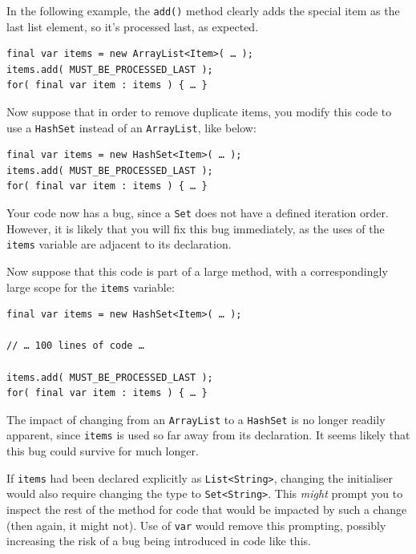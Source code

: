 \documentclass[11pt,a4paper, titlepage, parskip=half, headsepline, footsepline, cleardoublepage=current, headheight=1cm]{scrbook}
\begin{document}
In the following example, the \lstinline|add()| method clearly adds the special item as the last list element, so it’s processed last, as expected.
\begin{lstlisting}
final var items = new ArrayList<Item>( … );
items.add( MUST_BE_PROCESSED_LAST );
for( final var item : items ) { … }
\end{lstlisting}

Now suppose that in order to remove duplicate items, you modify this code to use a \lstinline|HashSet|\autocite{ORACLE_DOC_HASHSET_CLASS} instead of an \lstinline|ArrayList|\autocite{ORACLE_DOC_ARRAYLIST_CLASS}, like below:
\begin{lstlisting}
final var items = new HashSet<Item>( … );
items.add( MUST_BE_PROCESSED_LAST );
for( final var item : items ) { … }
\end{lstlisting}

Your code now has a bug, since a \lstinline|Set| does not have a defined iteration order. However, it is likely that you will fix this bug immediately, as the uses of the \lstinline|items| variable are adjacent to its declaration.

Now suppose that this code is part of a large method, with a correspondingly large scope for the \lstinline|items| variable:
\begin{lstlisting}
final var items = new HashSet<Item>( … );

// … 100 lines of code …

items.add( MUST_BE_PROCESSED_LAST );
for( final var item : items ) { … }
\end{lstlisting}

The impact of changing from an \lstinline|ArrayList| to a \lstinline|HashSet| is no longer readily apparent, since \lstinline|items| is used so far away from its declaration. It seems likely that this bug could survive for much longer.

If \lstinline|items| had been declared explicitly as \lstinline|List<String>|, changing the initialiser would also require changing the type to \lstinline|Set<String>|. This \textit{might} prompt you to inspect the rest of the method for code that would be impacted by such a change (then again, it might not). Use of \lstinline|var| would remove this prompting, possibly increasing the risk of a bug being introduced in code like this.
\end{document}
